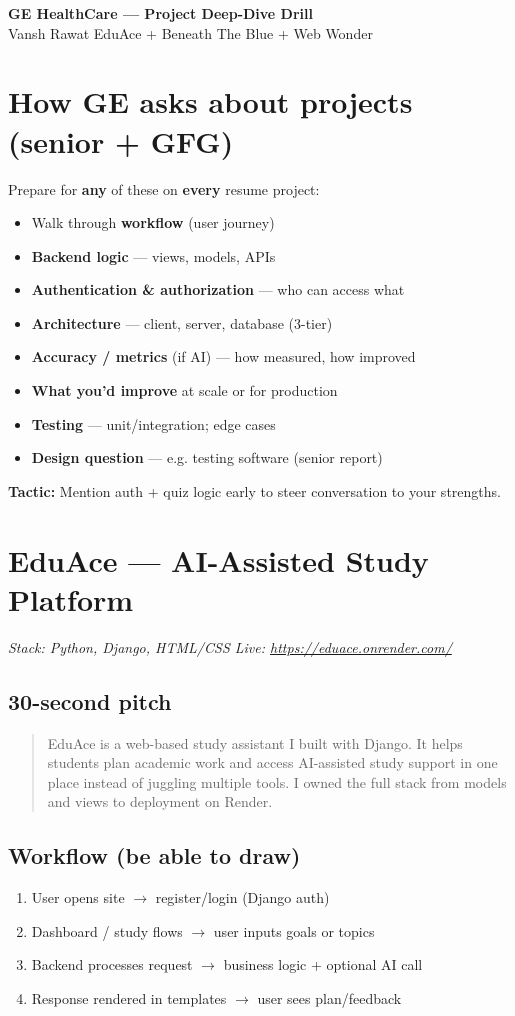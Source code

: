 \documentclass[11pt,a4paper]{article}
\newcommand{\Say}[1]{\begin{quote}\small #1\end{quote}}
\begin{document}
\begin{center}
  {\LARGE\bfseries GE HealthCare --- Project Deep-Dive Drill}\\[4pt]
  {\small Vansh Rawat \textbar{} EduAce + Beneath The Blue + Web Wonder}
\end{center}

\section{How GE asks about projects (senior + GFG)}
Prepare for \textbf{any} of these on \textbf{every} resume project:
\begin{itemize}
  \item Walk through \textbf{workflow} (user journey)
  \item \textbf{Backend logic} --- views, models, APIs
  \item \textbf{Authentication \& authorization} --- who can access what
  \item \textbf{Architecture} --- client, server, database (3-tier)
  \item \textbf{Accuracy / metrics} (if AI) --- how measured, how improved
  \item \textbf{What you'd improve} at scale or for production
  \item \textbf{Testing} --- unit/integration; edge cases
  \item \textbf{Design question} --- e.g. testing software (senior report)
\end{itemize}

\textbf{Tactic:} Mention auth + quiz logic early to steer conversation to your strengths.

\section{EduAce --- AI-Assisted Study Platform}
\textit{Stack: Python, Django, HTML/CSS \textbar{} Live: \url{https://eduace.onrender.com/}}

\subsection{30-second pitch}
\Say{EduAce is a web-based study assistant I built with Django. It helps students plan academic work and access AI-assisted study support in one place instead of juggling multiple tools. I owned the full stack from models and views to deployment on Render.}

\subsection{Workflow (be able to draw)}
\begin{enumerate}
  \item User opens site $\rightarrow$ register/login (Django auth)
  \item Dashboard / study flows $\rightarrow$ user inputs goals or topics
  \item Backend processes request $\rightarrow$ business logic + optional AI call
  \item Response rendered in templates $\rightarrow$ user sees plan/feedback
\end{enumerate}
\end{document}
